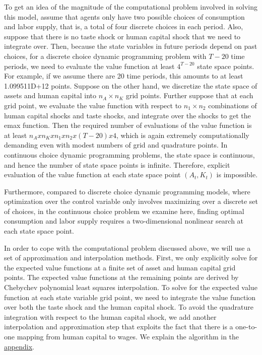 \documentclass[\econtexRoot/ImaiKeane]{subfiles}
\begin{document}
To get an idea of the magnitude of the computational problem involved in solving this model, assume that agents only have two possible choices of consumption and labor supply, that is, a total of four discrete choices in each period. Also, suppose that there is no taste shock or human capital shock that we need to integrate over. Then, because the state variables in future periods depend on past choices, for a discrete choice dynamic programming problem with $T - 20$ time periods, we need to evaluate the value function at least $4^{T-20}$ state space points. For example, if we assume there are 20 time periods, this amounts to at least 1.099511D+12 points. Suppose on the other hand, we discretize the state space of assets and human capital into $n_A \times n_K$ grid points. Further suppose that at each grid point, we evaluate the value function with respect to $n_1 \times n_2$ combinations of human capital shocks and taste shocks, and integrate over the shocks to get the emax function. Then the required number of evaluations of the value function is at least $n_A x n_K x n_1 x n_2 x (T - 20) x 4$, which is again extremely computationally demanding even with modest numbers of grid and quadrature points. In continuous choice dynamic programming problems, the state space is continuous, and hence the number of state space points is infinite. Therefore, explicit evaluation of the value function at each state space point $(A_t, K_t)$ is impossible. \par
Furthermore, compared to discrete choice dynamic programming models, where optimization over the control variable only involves maximizing over a discrete set of choices, in the continuous choice problem we examine here, finding optimal consumption and labor supply requires a two-dimensional nonlinear
 search at each state space point. \par
In order to cope with the computational problem discussed above, we will use a set of approximation and interpolation methods. First, we only explicitly solve for the expected value functions at a finite set of asset and human capital grid points. The expected value functions at the remaining points are derived by Chebychev polynomial least squares interpolation. To solve for the expected value function at each state variable grid point, we need to integrate the value function over both the taste shock and the human capital shock. To avoid the quadrature integration with respect to the human capital shock, we add another interpolation and approximation step that exploits the fact that there is a one-to-one mapping from human capital to wages. We explain the algorithm in the \hyperref[appendix]{appendix}. 
\end{document}
